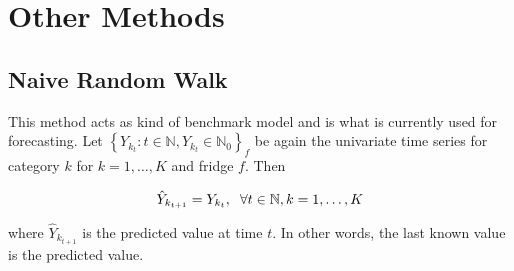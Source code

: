 \section{Other Methods}
\label{sec: Other methods}

\subsection{Naive Random Walk}
\label{sec: Naive Random Walk}

This method acts as kind of benchmark model and is what is currently used for forecasting. Let $\left\{Y_{k_t}:t\in \mathbb{N}, Y_{k_t} \in \mathbb{N}_0\right\}_f$ be again the univariate time series for category $k$ for $k=1,\ldots,K$ and fridge $f$. Then

\begin{equation}
\hat{Y}_{k_{t+1}}= Y_{k_t} ,\hspace{0.2cm} \forall t \in \mathbb{N}, k=1,\ldots,K
\label{eq: Random Walk Model}
\end{equation}

where $\hat{Y}_{k_{t+1}}$ is the predicted value at time $t$. In other words, the last known value is the predicted value. 